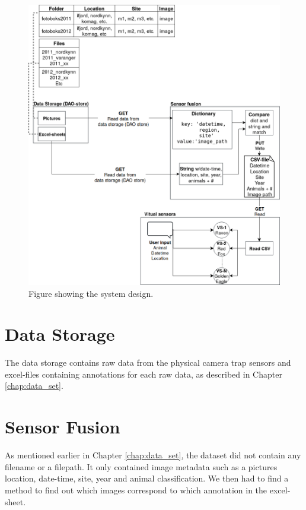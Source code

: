 \documentclass[USenglish]{uit-thesis}
\begin{document}
\begin{figure}
\centering
\includegraphics[width=\textwidth]{Design_done.png}
\caption{Figure showing the system design.}
\label{fig:design}
\end{figure}

\section{Data Storage}
The data storage contains raw data from the physical camera trap sensors and excel-files containing annotations for each raw data, as described in Chapter \ref{chap:data_set}.


\section{Sensor Fusion} \label{sec:des_fused}
As mentioned earlier in Chapter \ref{chap:data_set}, the dataset did not contain any filename or a filepath. It only contained image metadata such as a pictures location, date-time, site, year and animal classification. We then had to find a method to find out which images correspond to which annotation in the excel-sheet.
\\
\end{document}
